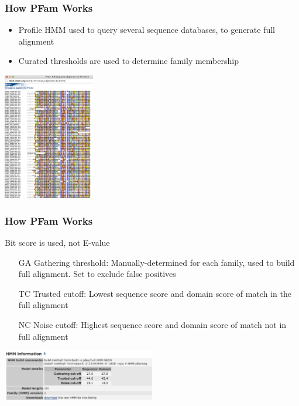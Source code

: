 \documentclass[table]{beamer}
\begin{document}
    \begin{frame}
      \frametitle{How PFam Works}   
      \begin{itemize}
        \item Profile HMM used to query several sequence databases, to generate full alignment
        \item Curated thresholds are used to determine family membership
      \end{itemize}
      \begin{center}
        \includegraphics[width=0.3\textwidth]{images/pfam3} 
      \end{center}      
    \end{frame}

    \begin{frame}
      \frametitle{How PFam Works}  
      Bit score is used, not E-value
      \begin{itemize}
        \item [GA] Gathering threshold: Manually-determined for each family, used to build full alignment. Set to exclude false positives 
        \item [TC] Trusted cutoff: Lowest sequence score and domain score of match in the full alignment
        \item [NC] Noise cutoff: Highest sequence score and domain score of match not in full alignment
      \end{itemize}
      \begin{center}
        \includegraphics[width=0.5\textwidth]{images/pfam4} 
      \end{center}      
    \end{frame}
\end{document}
